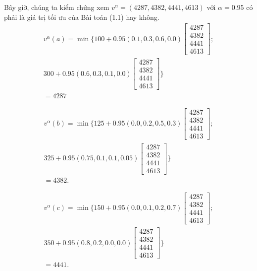 \documentclass[12pt,a4paper]{report}
\begin{document}
    
    \medskip
    Bây giờ, chúng ta kiểm chứng xem $v^\alpha=(4287,4382, 4441,4613)$ với $\alpha=0.95$ có phải là giá trị tối ưu của Bài toán (1.1) hay không.
    \begin{align*}
    v^\alpha(a)=\min\{100+0.95(0.1,0.3,0.6,0.0)
    \left[
    \begin{array}{c}
    4287\\
    4382\\
    4441\\
    4613
    \end{array}
    \right];\\
    300+0.95(0.6,0.3,0.1,0.0)  \left[
    \begin{array}{c}
    4287\\
    4382\\
    4441\\
    4613
    \end{array}
    \right]\}\\
    =4287
    \end{align*}
    
     \begin{align*}
    v^\alpha(b)=\min\{125+0.95(0.0,0.2,0.5,0.3)
    \left[
    \begin{array}{c}
    4287\\
    4382\\
    4441\\
    4613
    \end{array}
    \right];\\
    325+0.95(0.75,0.1,0.1,0.05)  \left[
    \begin{array}{c}
    4287\\
    4382\\
    4441\\
    4613
    \end{array}
    \right]\}\\
    =4382.
    \end{align*}
    
     \begin{align*}
    v^\alpha(c)=\min\{150+0.95(0.0,0.1,0.2,0.7)
    \left[
    \begin{array}{c}
    4287\\
    4382\\
    4441\\
    4613
    \end{array}
    \right];\\
    350+0.95(0.8,0.2,0.0,0.0)  
    \left[
    \begin{array}{c}
    4287\\
    4382\\
    4441\\
    4613
    \end{array}
    \right]\}\\
    =4441.
    \end{align*}
    
\end{document}
